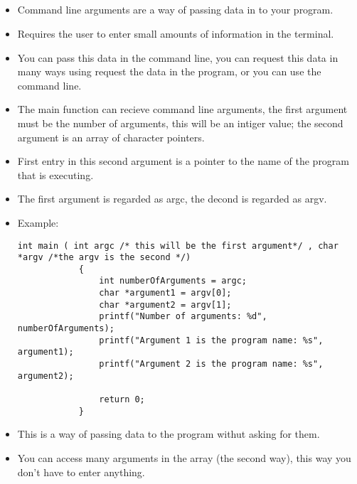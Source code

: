 \subsection{}
\begin{itemize}
    \item Command line arguments are a way of passing data in to your program. 
    \item Requires the user to enter small amounts of information in the terminal.
    \item You can pass this data in the command line, you can request this data in many ways using request the data in the program, or you can use the command line.
    \item The main function can recieve command line arguments, the first argument must be the number of arguments, this will be an intiger value; the second argument is an array of character pointers.
    \item First entry in this second argument is a pointer to the name of the program that is executing.
    \item The first argument is regarded as argc, the decond is regarded as argv.
    \item Example:
        \begin{Verbatim}[breaklines=true, breakanywhere=true]
            int main ( int argc /* this will be the first argument*/ , char *argv /*the argv is the second */)
            {
                int numberOfArguments = argc;
                char *argument1 = argv[0];
                char *argument2 = argv[1];
                printf("Number of arguments: %d", numberOfArguments);
                printf("Argument 1 is the program name: %s", argument1);
                printf("Argument 2 is the program name: %s", argument2);

                return 0;
            }
        \end{Verbatim}
    
    \item This is a way of passing data to the program withut asking for them.
    \item You can access many arguments in the array (the second way), this way you don't have to enter anything.
\end{itemize}
